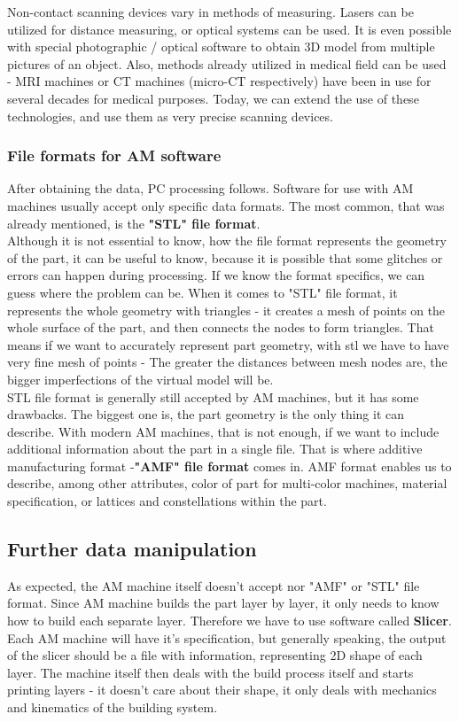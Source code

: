 \documentclass[a4paper, twoside, 11pt]{report}
\begin{document}
Non-contact scanning devices vary in methods of measuring. Lasers can be utilized for distance measuring, or optical systems can be used. It is even possible with special photographic / optical software to obtain 3D model from multiple pictures of an object. Also, methods already utilized in medical field can be used - MRI machines or CT machines (micro-CT respectively) have been in use for several decades for medical purposes. Today, we can extend the use of these technologies, and use them as very precise scanning devices.
\subsubsection{File formats for AM software}
After obtaining the data, PC processing follows. Software for use with AM machines usually accept only specific data formats. The most common, that was already mentioned, is the \textbf{"STL" file format}.\\
Although it is not essential to know, how the file format represents the geometry of the part, it can be useful to know, because it is possible that some glitches or errors can happen during processing. If we know the format specifics, we can guess where the problem can be. When it comes to "STL" file format, it represents the whole geometry with triangles - it creates a mesh of points on the whole surface of the part, and then connects the nodes to form triangles. That means if we want to accurately represent part geometry, with stl we have to have very fine mesh of points - The greater the distances between mesh nodes are, the bigger imperfections of the virtual model will be.\\
STL file format is generally still accepted by AM machines, but it has some drawbacks. The biggest one is, the part geometry is the only thing it can describe. With modern AM machines, that is not enough, if we want to include additional information about the part in a single file. That is where additive manufacturing format -\textbf{"AMF" file format} comes in. AMF format enables us to describe, among other attributes, color of part for multi-color machines, material specification, or lattices and constellations within the part.
\subsection{Further data manipulation}
As expected, the AM machine itself doesn't accept nor "AMF" or "STL" file format. Since AM machine builds the part layer by layer, it only needs to know how to build each separate layer. Therefore we have to use software called \textbf{Slicer}. Each AM machine will have it's specification, but generally speaking, the output of the slicer should be a file with information, representing 2D shape of each layer. The machine itself then deals with the build process itself and starts printing layers - it doesn't care about their shape, it only deals with mechanics and kinematics of the building system.
\end{document}
